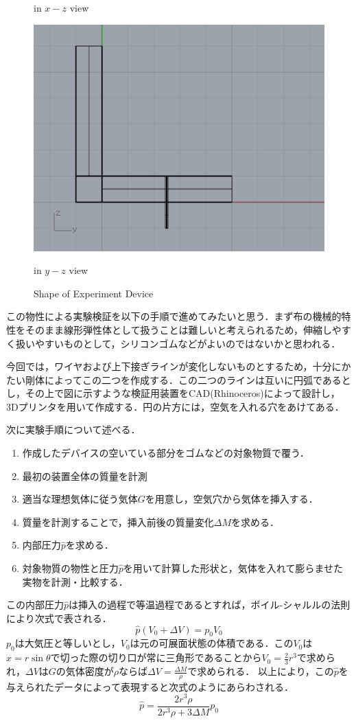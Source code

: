 \documentclass[11pt]{jsarticle}
\begin{document}
\begin{figure}[thpb]
\begin{minipage}{0.5\hsize}
				\caption{in $ x-z $ view}
			\end{minipage}
			\begin{minipage}{0.5\hsize}
				\centering
				\includegraphics[width = 0.6\columnwidth]{./figure/ExperimentDevice_yzview.png}
				\caption{in $ y-z $ view}
			\end{minipage}
			\caption{Shape of Experiment Device}
		\end{figure}
		この物性による実験検証を以下の手順で進めてみたいと思う．まず布の機械的特性をそのまま線形弾性体として扱うことは難しいと考えられるため，伸縮しやすく扱いやすいものとして，シリコンゴムなどがよいのではないかと思われる．
		
		今回では，ワイヤおよび上下接ぎラインが変化しないものとするため，十分にかたい剛体によってこの二つを作成する．この二つのラインは互いに円弧であるとし，その上で図に示すような検証用装置をCAD(Rhinoceros)によって設計し，3Dプリンタを用いて作成する．円の片方には，空気を入れる穴をあけてある．
		
		次に実験手順について述べる．
		\begin{enumerate}
			\item 作成したデバイスの空いている部分をゴムなどの対象物質で覆う．
			\item 最初の装置全体の質量を計測
			\item 適当な理想気体に従う気体$ G $を用意し，空気穴から気体を挿入する．
			\item 質量を計測することで，挿入前後の質量変化$ \Delta M $を求める．
			\item 内部圧力$ \hat{p} $を求める．
			\item 対象物質の物性と圧力$ \hat{p} $を用いて計算した形状と，気体を入れて膨らませた実物を計測・比較する．
		\end{enumerate}
	
		この内部圧力$ \hat{p} $は挿入の過程で等温過程であるとすれば，ボイル-シャルルの法則により次式で表される．
		\begin{equation}\label{eq:boil}
			\hat{p}(V_0 + \Delta V) = p_0 V_0
		\end{equation}
		$ p_0 $は大気圧と等しいとし，$ V_0 $は元の可展面状態の体積である．この$ V_0 $は$ x=r\sin \theta $で切った際の切り口が常に三角形であることから$ V_0 = \frac{2}{3} r^3$で求められ，$ \Delta V $は$ G $の気体密度が$ \rho$ならば$ \Delta V  = \frac{\Delta M}{\rho}$で求められる．
		以上により，この$ \hat{p} $を与えられたデータによって表現すると次式のようにあらわされる．
		\begin{equation}\label{eq:PressEq}
			\hat{p} = \frac{2 r^3 \rho}{2 r^3 \rho + 3 \Delta M} p_0
		\end{equation}
		
\end{document}
